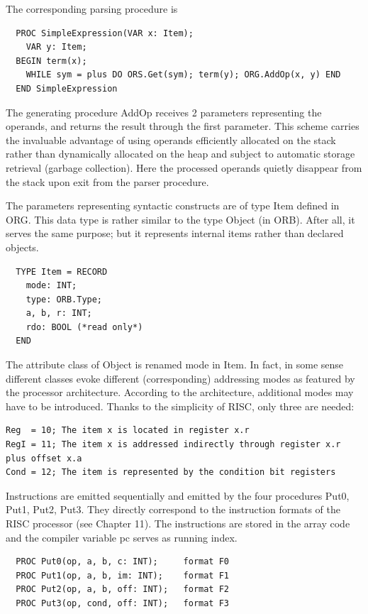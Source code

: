 The corresponding parsing procedure is
\begin{verbatim}
  PROC SimpleExpression(VAR x: Item);
    VAR y: Item;
  BEGIN term(x);
    WHILE sym = plus DO ORS.Get(sym); term(y); ORG.AddOp(x, y) END
  END SimpleExpression
\end{verbatim}

The generating procedure AddOp receives 2 parameters representing the operands, and returns
the result through the first parameter. This scheme carries the invaluable advantage of using
operands efficiently allocated on the stack rather than dynamically allocated on the heap and
subject to automatic storage retrieval (garbage collection). Here the processed operands quietly
disappear from the stack upon exit from the parser procedure.

The parameters representing syntactic constructs are of type Item defined in ORG. This data type
is rather similar to the type Object (in ORB). After all, it serves the same purpose; but it represents
internal items rather than declared objects.
\begin{verbatim}
  TYPE Item = RECORD
    mode: INT;
    type: ORB.Type;
    a, b, r: INT;
    rdo: BOOL (*read only*)
  END
\end{verbatim}

The attribute class of Object is renamed mode in Item. In fact, in some sense different classes
evoke different (corresponding) addressing modes as featured by the processor architecture.
According to the architecture, additional modes may have to be introduced. Thanks to the simplicity
of RISC, only three are needed:
\begin{verbatim}
Reg  = 10; The item x is located in register x.r
RegI = 11; The item x is addressed indirectly through register x.r plus offset x.a
Cond = 12; The item is represented by the condition bit registers
\end{verbatim}

Instructions are emitted sequentially and emitted by the four procedures Put0, Put1, Put2, Put3.
They directly correspond to the instruction formats of the RISC processor (see Chapter 11). The
instructions are stored in the array code and the compiler variable pc serves as running index.
\begin{verbatim}
  PROC Put0(op, a, b, c: INT);     format F0
  PROC Put1(op, a, b, im: INT);    format F1
  PROC Put2(op, a, b, off: INT);   format F2
  PROC Put3(op, cond, off: INT);   format F3
\end{verbatim}

